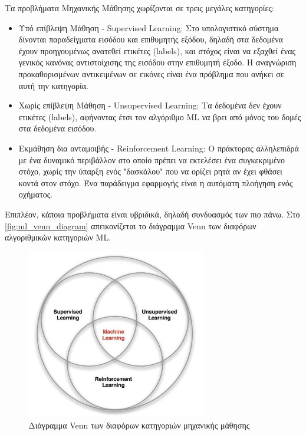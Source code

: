 Τα προβλήματα Μηχανικής Μάθησης χωρίζονται σε τρεις μεγάλες κατηγορίες:
\begin{itemize}
  \item{Υπό επίβλεψη Μάθηση - Supervised Learning:
      Στο υπολογιστικό σύστημα δίνονται παραδείγματα εισόδου και επιθυμητής εξόδου,
      δηλαδή στα δεδομένα έχουν προηγουμένως ανατεθεί ετικέτες (labels),
      και στόχος είναι να εξαχθεί ένας γενικός κανόνας αντιστοίχισης της εισόδου στην επιθυμητή έξοδο.
      Η αναγνώριση προκαθορισμένων αντικειμένων σε εικόνες είναι ένα πρόβλημα που ανήκει 
      σε αυτή την κατηγορία.
    }
  \item{Χωρίς επίβλεψη Μάθηση - Unsupervised Learning:
      Τα δεδομένα δεν έχουν ετικέτες (labels), αφήνοντας έτσι τον αλγόριθμο ML να βρει
      από μόνος του δομές στα δεδομένα εισόδου.
    }
  \item{Εκμάθηση δια ανταμοιβής - Reinforcement Learning:
      Ο πράκτορας αλληλεπιδρά με ένα δυναμικό περιβάλλον στο οποίο πρέπει να
      εκτελέσει ένα συγκεκριμένο στόχο, χωρίς την ύπαρξη ενός "δασκάλου" που να
      ορίζει ρητά αν έχει φθάσει κοντά στον στόχο. Ένα παράδειγμα εφαρμογής
      είναι η αυτόματη πλοήγηση ενός οχήματος.
    }
\end{itemize}
Επιπλέον, κάποια προβλήματα είναι υβριδικά, δηλαδή συνδυασμός των πιο πάνω.
Στο \autoref{fig:ml_venn_diagram} απεικονίζεται το διάγραμμα Venn των διαφόρων 
αλγοριθμικών κατηγοριών ML.
\begin{figure}[!ht]
  \centering
  \includegraphics[width=0.7\textwidth]{./images/chapter3/ml_venn_diagram.jpg}
  \caption[Διάγραμμα Venn των διαφόρων κατηγοριών μηχανικής μάθησης]{Διάγραμμα Venn των διαφόρων κατηγοριών μηχανικής μάθησης}
  \label{fig:ml_venn_diagram}
\end{figure}

